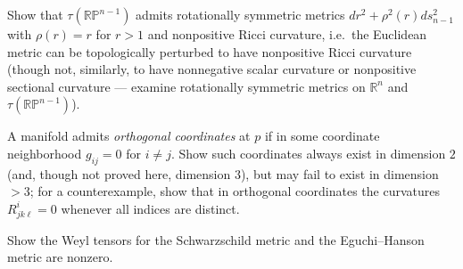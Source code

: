 \begin{remark}
  \label{rem:pet-ch4-ex-25}
  Show that $\tau(\mathbb{RP}^{n-1})$ admits rotationally symmetric metrics
  $dr^2+\rho^2(r)ds_{n-1}^2$ with $\rho(r)=r$ for $r>1$ and nonpositive Ricci
  curvature, i.e.\ the Euclidean metric can be topologically perturbed to have
  nonpositive Ricci curvature (though not, similarly, to have nonnegative
  scalar curvature or nonpositive sectional curvature — examine rotationally
  symmetric metrics on $\mathbb{R}^n$ and $\tau(\mathbb{RP}^{n-1})$).
\end{remark}

\begin{remark}
  \label{rem:pet-ch4-ex-26}
  A manifold admits \emph{orthogonal coordinates} at $p$ if in some coordinate
  neighborhood $g_{ij}=0$ for $i\ne j$. Show such coordinates always exist in
  dimension $2$ (and, though not proved here, dimension $3$), but may fail to
  exist in dimension $>3$; for a counterexample, show that in orthogonal
  coordinates the curvatures $R^i_{jk\ell}=0$ whenever all indices are
  distinct.
\end{remark}

\begin{remark}
  \label{rem:pet-ch4-ex-27}
  Show the Weyl tensors for the Schwarzschild metric and the Eguchi--Hanson
  metric are nonzero.
\end{remark}

